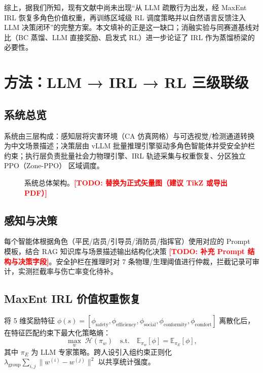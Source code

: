 \documentclass[UTF8,zihao=-4]{ctexart}
\newcommand{\todo}[1]{\textcolor{red}{\textbf{[TODO: #1]}}}
\begin{document}
综上，据我们所知，现有文献中尚未出现“从 LLM 疏散行为出发，经 MaxEnt IRL 恢复多角色价值权重，再训练区域级 RL 调度策略并以自然语言反馈注入 LLM 决策闭环”的完整方案。本文填补的正是这一缺口；消融实验与同赛道基线对比（BC 蒸馏、LLM 直接奖励、启发式 RL）进一步论证了 IRL 作为蒸馏桥梁的必要性。

\section{方法：LLM → IRL → RL 三级联级}

\subsection{系统总览}

系统由三层构成：感知层将灾害环境（CA 仿真网格）与可选视觉/检测通道转换为中文场景描述；决策层由 vLLM 批量推理引擎驱动多角色智能体并受安全护栏约束；执行层负责批量社会力物理引擎、IRL 轨迹采集与权重恢复、分区独立 PPO（Zone-PPO） 区域调度。

\begin{figure}[t]
  \centering
  \caption{系统总体架构。\todo{替换为正式矢量图（建议 TikZ 或导出 PDF）}}
  \label{fig:architecture}
\end{figure}

\subsection{感知与决策}

每个智能体根据角色（平民/店员/引导员/消防员/指挥官）使用对应的 Prompt 模板，结合 RAG 知识库与场景描述输出结构化决策 \todo{补充 Prompt 结构与决策字段}。安全护栏在推理时对 7 条物理/生理阈值进行仲裁，拦截记录可审计，实测拦截率与伤亡率变化待补。

\subsection{MaxEnt IRL 价值权重恢复}

将 5 维奖励特征 $\phi(s) = [\phi_{\text{safety}}, \phi_{\text{efficiency}}, \phi_{\text{social}}, \phi_{\text{conformity}}, \phi_{\text{comfort}}]$ 离散化后，在特征匹配约束下最大化策略熵：
\begin{equation}
  \max_{w} \; \mathcal{H}(\pi_w)
  \quad \text{s.t.} \quad
  \mathbb{E}_{\pi_w}[\phi] = \mathbb{E}_{\pi_E}[\phi],
\end{equation}
其中 $\pi_E$ 为 LLM 专家策略。跨人设引入组约束正则化 $\lambda_{\text{group}} \sum_{i,j}\lVert w^{(i)} - w^{(j)}\rVert^2$ 以共享统计强度。
\end{document}
